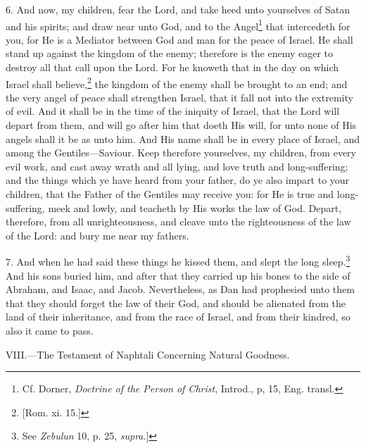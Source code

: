 6. And now, my children, fear the Lord, and take heed unto yourselves of Satan and his spirits; and draw near unto God, and to the Angel\footnote{Cf. Dorner, \emph{Doctrine of the Person of Christ}, Introd., p, 15, Eng. transl.} that intercedeth for you, for He is a Mediator between God and man for the peace of Israel. He shall stand up against the kingdom of the enemy; therefore is the enemy eager to destroy all that call upon the Lord. For he knoweth that in the day on which Israel shall believe,\footnote{[Rom. xi. 15.]} the kingdom of the enemy shall be brought to an end; and the very angel of peace shall strengthen Israel, that it fall not into the extremity of evil. And it shall be in the time of the iniquity of Israel, that the Lord will depart from them, and will go after him that doeth His will, for unto none of His angels shall it be as unto him. And His name shall be in every place of Israel, and among the Gentiles—Saviour. Keep therefore yourselves, my children, from every evil work, and cast away wrath and all lying, and love truth and long-suffering; and the things which ye have heard from your father, do ye also impart to your children, that the Father of the Gentiles may receive you: for He is true and long-suffering, meek and lowly, and teacheth by His works the law of God. Depart, therefore, from all unrighteousness, and cleave unto the righteousness of the law of the Lord: and bury me near my fathers.

7. And when he had said these things he kissed them, and slept the long sleep.\footnote{See \emph{Zebulun} 10, p. 25, \emph{supra}.]} And his sons buried him, and after that they carried up his bones to the side of Abraham, and Isaac, and Jacob. Nevertheless, as Dan had prophesied unto them that they should forget the law of their God, and should be alienated from the land of their inheritance, and from the race of Israel, and from their kindred, so also it came to pass.


VIII.—The Testament of Naphtali Concerning Natural Goodness.

